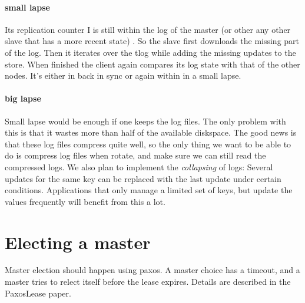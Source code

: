 \paragraph{small lapse}
Its replication counter I is still within the log of the master
(or other any other slave that has a more recent state) . 
So the slave first downloads the missing part of the log.
Then it iterates over the tlog while adding the missing updates to the store.
When finished the client again compares its log state with that of the other nodes. 
It's either in back in sync or again within in a small lapse.

\paragraph{big lapse}
Small lapse would be enough if one keeps the log files. 
The only problem with this is that it wastes more than half of the available diskspace. 
The good news is that these log files compress quite well, 
so the only thing we want to be able to do is compress log files when rotate, 
and make sure we can still read the compressed logs. 
We also plan to implement the \emph{collapsing} of logs: 
Several updates for the same key can be replaced with the last update under certain conditions.
Applications that only manage a limited set of keys, but update the values frequently will benefit from this a lot.
\section{Electing a master}
Master election should happen using paxos. 
A master choice has a timeout, and a master tries to relect itself before the lease expires.
Details are described in the PaxosLease paper.


